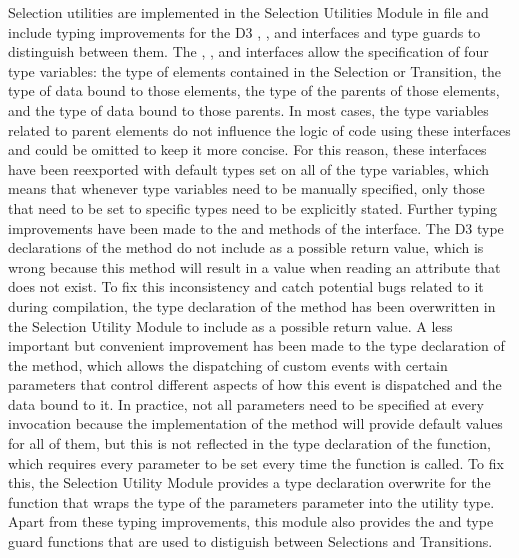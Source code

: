 Selection utilities are implemented in the Selection Utilities Module
in file  and include typing improvements
for the D3 , , and
 interfaces and type guards to distinguish
between them.  The , , and
 interfaces allow the specification of
four type variables: the type of elements contained in the Selection
or Transition, the type of data bound to those elements, the type of
the parents of those elements, and the type of data bound to those
parents.  In most cases, the type variables related to parent elements
do not influence the logic of code using these interfaces and could be
omitted to keep it more concise.  For this reason, these interfaces
have been reexported with default types set on all of the type
variables, which means that whenever type variables need to be
manually specified, only those that need to be set to specific types
need to be explicitly stated.  Further typing improvements have been
made to the  and  methods of the
 interface.  The D3 type declarations of the
 method do not include  as a possible
return value, which is wrong because this method will result in a
 value when reading an attribute that does not exist.  To
fix this inconsistency and catch potential bugs related to it during
compilation, the type declaration of the  method
has been overwritten in the Selection Utility Module to include
 as a possible return value.  A less important but
convenient improvement has been made to the type declaration of the
 method, which allows the dispatching of
custom events with certain parameters that control different aspects
of how this event is dispatched and the data bound to it.  In
practice, not all parameters need to be specified at every invocation
because the implementation of the  method
will provide default values for all of them, but this is not reflected
in the type declaration of the function, which requires every
parameter to be set every time the function is called.  To fix this,
the Selection Utility Module provides a type declaration overwrite for
the  function that wraps the type of the
parameters parameter into the  utility type.  Apart from
these typing improvements, this module also provides the
 and  type guard functions that
are used to distiguish between Selections and Transitions.


